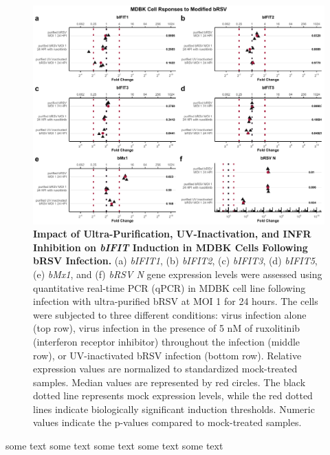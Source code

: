 \begin{figure}
    \centering
    \includegraphics[width=1\linewidth]{07. Chapter 2/Figs/02. Induction/04. mdbk_brsv_uv_roxo.pdf}
    \caption[Impact of Ultra-Purification, UV-Inactivation, and INFR Inhibition on \textit{bIFIT} Induction in MDBK Cells Following bRSV Infection.]{\textbf{Impact of Ultra-Purification, UV-Inactivation, and INFR Inhibition on \textit{bIFIT} Induction in MDBK Cells Following bRSV Infection.} (a) \textit{bIFIT1}, (b) \textit{bIFIT2}, (c) \textit{bIFIT3}, (d) \textit{bIFIT5}, (e) \textit{bMx1}, and (f) \textit{bRSV N} gene expression levels were assessed using quantitative real-time PCR (qPCR) in MDBK cell line following infection with ultra-purified bRSV at MOI 1 for 24 hours. The cells were subjected to three different conditions: virus infection alone (top row), virus infection in the presence of 5 nM of ruxolitinib (interferon receptor inhibitor) throughout the infection (middle row), or UV-inactivated bRSV infection (bottom row). Relative expression values are normalized to standardized mock-treated samples. Median values are represented by red circles. The black dotted line represents mock expression levels, while the red dotted lines indicate biologically significant induction thresholds. Numeric values indicate the p-values compared to mock-treated samples.}
    \label{fig:The effect of ultra-purification, UV-inactivation and INFR inhibition on hIFIT induction following hRSV infection in MDBK}
\end{figure}


some text some text some text some text some text


